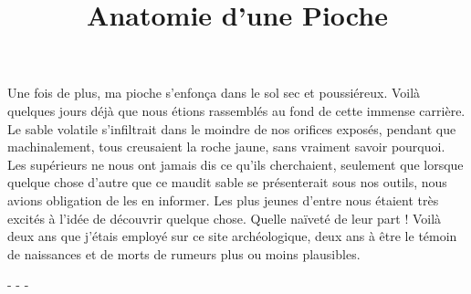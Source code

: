 \documentclass[12pt,a4paper,article]{memoir} %
\title{Anatomie d'une Pioche}
\author{}
\date{} %
\begin{document}
\maketitle

Une fois de plus, ma pioche s'enfon\c{c}a dans le sol sec et poussi\'{e}reux. Voil\`{a} quelques jours d\'{e}j\`{a} que nous \'{e}tions rassembl\'{e}s au fond de cette immense carri\`{e}re. Le sable volatile s'infiltrait dans le moindre de nos orifices expos\'{e}s, pendant que machinalement, tous creusaient la roche jaune, sans vraiment savoir pourquoi. Les sup\'{e}rieurs ne nous ont jamais dis ce qu'ils cherchaient, seulement que lorsque quelque chose d'autre que ce maudit sable se pr\'{e}senterait sous nos outils, nous avions obligation de les en informer. Les plus jeunes d'entre nous \'{e}taient tr\`{e}s excit\'{e}s \`{a} l'id\'{e}e de d\'{e}couvrir quelque chose. Quelle na\"{i}vet\'{e} de leur part ! Voil\`{a} deux ans que j'\'{e}tais employ\'{e} sur ce site arch\'{e}ologique, deux ans \`{a} \^{e}tre le t\'{e}moin de naissances et de morts de rumeurs plus ou moins plausibles.

\centerline{- - -}
\end{document}
